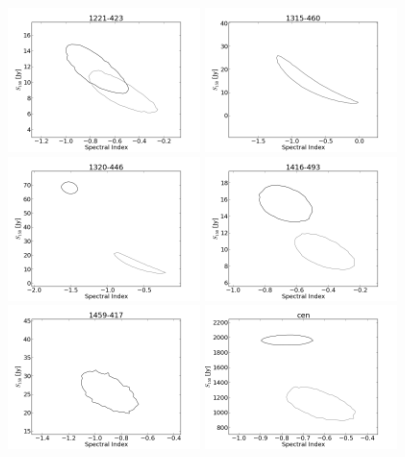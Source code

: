 \documentclass[preprint]{aastex}
\begin{document}
\begin{figure}[htbp]
\begin{center}
\includegraphics[width=2in]{plots/1221-423_SI_MCMC.png} %
\includegraphics[width=2in]{plots/1315-460_SI_MCMC.png} %
\includegraphics[width=2in]{plots/1320-446_SI_MCMC.png} %
\includegraphics[width=2in]{plots/1416-493_SI_MCMC.png} %
\includegraphics[width=2in]{plots/1459-417_SI_MCMC.png} %
\includegraphics[width=2in]{plots/cen_SI_MCMC.png} %

\end{center}
\end{figure}
\end{document}
